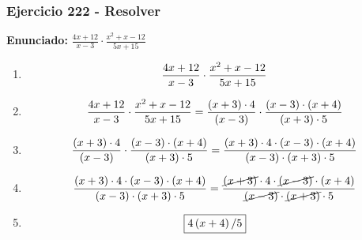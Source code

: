 \documentclass[11pt,a4paper]{article}
\newcommand{\fitmath}[1]{%
\[
\setbox0=\hbox{$\displaystyle #1$}%
\ifdim\wd0>\linewidth
\resizebox{\linewidth}{!}{$\displaystyle #1$}%
\else
#1%
\fi
\]
}
\begin{document}
\subsubsection*{Ejercicio 222 - Resolver}
\textbf{Enunciado:} $ \frac{4 x + 12}{x - 3} \cdot \frac{x^{2} + x - 12}{5 x + 15} $\par
\begin{enumerate}[leftmargin=2em]
\item \fitmath{\frac{4 x + 12}{x - 3} \cdot \frac{x^{2} + x - 12}{5 x + 15}}
\item \fitmath{\frac{4 x + 12}{x - 3} \cdot \frac{x^{2} + x - 12}{5 x + 15}= \frac{\left(x + 3\right)\cdot 4}{\left(x - 3\right)} \cdot \frac{\left(x - 3\right)\cdot \left(x + 4\right)}{\left(x + 3\right)\cdot 5}}
\item \fitmath{\frac{\left(x + 3\right)\cdot 4}{\left(x - 3\right)}\cdot \frac{\left(x - 3\right)\cdot \left(x + 4\right)}{\left(x + 3\right)\cdot 5}= \frac{\left(x + 3\right)\cdot 4\cdot \left(x - 3\right)\cdot \left(x + 4\right)}{\left(x - 3\right)\cdot \left(x + 3\right)\cdot 5}}
\item \fitmath{\frac{\left(x + 3\right)\cdot 4\cdot \left(x - 3\right)\cdot \left(x + 4\right)}{\left(x - 3\right)\cdot \left(x + 3\right)\cdot 5}= \frac{\cancel{\left(x + 3\right)}\cdot 4\cdot \cancel{\left(x - 3\right)}\cdot \left(x + 4\right)}{\cancel{\left(x - 3\right)}\cdot \cancel{\left(x + 3\right)}\cdot 5}}
\item \fitmath{\boxed{4 \left(x + 4\right) / 5}}
\end{enumerate}

\vspace{0.12cm}
\end{document}
